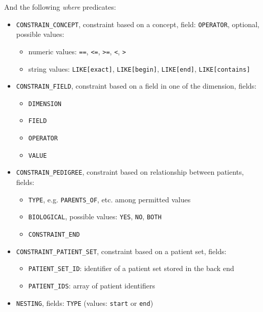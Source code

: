 And the following \emph{where} predicates:
\begin{itemize}
    \item \verb|CONSTRAIN_CONCEPT|, constraint based on a concept, field:
    \verb|OPERATOR|, optional, possible values:
    \begin{itemize}
        \item numeric values: \verb|==|, \verb|<=|, \verb|>=|, \verb|<|, \verb|>|
        \item string values: \verb|LIKE[exact]|, \verb|LIKE[begin]|, \verb|LIKE[end]|, \verb|LIKE[contains]|
    \end{itemize}

    \item \verb|CONSTRAIN_FIELD|, constraint based on a field in one of the dimension, fields:
    \begin{itemize}
        \item \verb|DIMENSION|
        \item \verb|FIELD|
        \item \verb|OPERATOR|
        \item \verb|VALUE|
    \end{itemize}
    
    \item \verb|CONSTRAIN_PEDIGREE|, constraint based on relationship between patients, fields:
    \begin{itemize}
        \item \verb|TYPE|, e.g. \verb|PARENTS_OF|, etc. among permitted values
        \item \verb|BIOLOGICAL|, possible values: \verb|YES|, \verb|NO|, \verb|BOTH|
        \item \verb|CONSTRAINT_END|
    \end{itemize}
    
    \item \verb|CONSTRAINT_PATIENT_SET|, constraint based on a patient set, fields:
    \begin{itemize}
        \item \verb|PATIENT_SET_ID|: identifier of a patient set stored in the back end
        \item \verb|PATIENT_IDS|: array of patient identifiers
    \end{itemize}
    
    \item \verb|NESTING|, fields: \verb|TYPE| (values: \verb|start| or \verb|end|)
    
\end{itemize}


